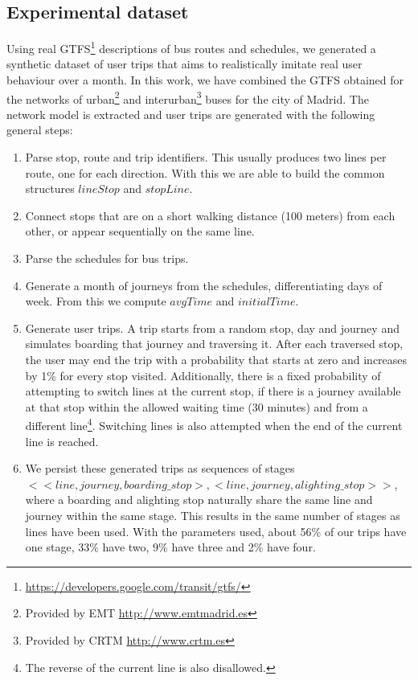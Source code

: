 \documentclass[runningheads]{llncs}
\begin{document}
\subsection{Experimental dataset}
\label{sec:data}
Using real GTFS\footnote{\url{https://developers.google.com/transit/gtfs/}} descriptions of bus routes and schedules, we generated a synthetic dataset of user trips that aims to realistically imitate real user behaviour over a month. In this work, we have combined the GTFS obtained for the networks of urban\footnote{Provided by EMT \url{http://www.emtmadrid.es}} and interurban\footnote{Provided by CRTM \url{http://www.crtm.es}} buses for the city of Madrid. The network model is extracted and user trips are generated with the following general steps:

\begin{enumerate}
    \item Parse stop, route and trip identifiers. This usually produces two lines per route, one for each direction. With this we are able to build the common structures $lineStop$ and $stopLine$.
    \item Connect stops that are on a short walking distance (100 meters) from each other, or appear sequentially on the same line.
    \item Parse the schedules for bus trips.
    \item Generate a month of journeys from the schedules, differentiating days of week. From this we compute $avgTime$ and $initialTime$.
    \item Generate user trips. A trip starts from a random stop, day and journey and simulates boarding that journey and traversing it. After each traversed stop, the user may end the trip with a probability that starts at zero and increases by 1\% for every stop visited. Additionally, there is a fixed probability of attempting to switch lines at the current stop, if there is a journey available at that stop within the allowed waiting time (30 minutes) and from a different line\footnote{The reverse of the current line is also disallowed.}. Switching lines is also attempted when the end of the current line is reached.
    \item We persist these generated trips as sequences of stages \\ $<<line,journey,boarding\_stop>, <line,journey,alighting\_stop>>$,\\ where a boarding and alighting stop naturally share the same line and journey within the same stage. This results in the same number of stages as lines have been used. With the parameters used, about 56\% of our trips have one stage, 33\% have two, 9\% have three and 2\% have four.
\end{enumerate}
\end{document}
